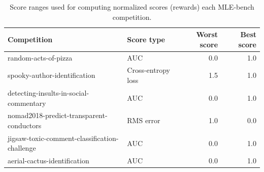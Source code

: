 \begin{table}[htb]
\centering
\begin{tabular}{l l r r}
\toprule
\textbf{Competition} & \textbf{Score type} & \textbf{Worst score} & \textbf{Best score} \\
\midrule
random-acts-of-pizza & AUC & 0.0 & 1.0 \\
spooky-author-identification & Cross-entropy loss & 1.5 & 1.0 \\
detecting-insults-in-social-commentary & AUC & 0.0 & 1.0 \\
nomad2018-predict-transparent-conductors & RMS error & 1.0 & 0.0 \\
jigsaw-toxic-comment-classification-challenge & AUC & 0.0 & 1.0 \\
aerial-cactus-identification & AUC & 0.0 & 1.0 \\
\bottomrule
\end{tabular}
\caption{Score ranges used for computing normalized scores (rewards) each MLE-bench competition.}
\label{tab:mlebench_competition_meta}
\end{table}
